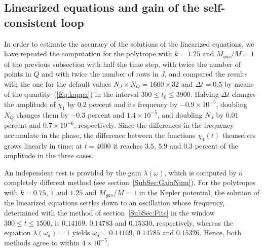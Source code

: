 \subsection{Linearized equations and gain of the self-consistent loop}
\label{SubSec:ValLinear}

In order to estimate the accuracy of the solutions of the linearized equations, we have repeated the computation for the polytrope with $k = 1.25$ and $M_{gas}/M = 1$ of the previous subsection with half the time step, with twice the number of points in $Q$ and with twice the number of rows in $J$, and compared the results with the one for the default values $N_J\times N_Q = 1600\times 32$ and $\Delta t = 0.5$ by means of the quantity~(\ref{Eq:kappa}) in the interval $300\leq t_0\leq 3900$. Halving $\Delta t$ changes the amplitude of $\chi_1$ by $0.2$ percent and its frequency by $-0.9\times 10^{-5}$, doubling $N_Q$ changes them by $-0.3$ percent and $1.4\times 10^{-5}$, and doubling $N_J$ by $0.01$ percent and $0.7\times 10^{-6}$, respectively. Since the differences in the frequency accumulate in the phase, the difference between the functions $\chi_1(t)$ themselves grows linearly in time; at $t = 4000$ it reaches $3.5$, $5.9$ and $0.3$ percent of the amplitude in the three cases.

An independent test is provided by the gain $\lambda(\omega)$, which is computed by a completely different method (see section~\ref{SubSec:GainNum}). For the polytropes with $k = 0.75$, $1$ and $1.25$ and $M_{gas}/M = 1$ in the Kepler potential, the solution of the linearized equations settles down to an oscillation whose frequency, determined with the method of section~\ref{SubSec:Fits} in the window $300\leq t\leq 1500$, is $0.14169$, $0.14783$ and $0.15330$, respectively, whereas the equation $\lambda(\omega_d) = 1$ yields $\omega_d = 0.14169$, $0.14785$ and $0.15326$. Hence, both methods agree to within $4\times 10^{-5}$.

